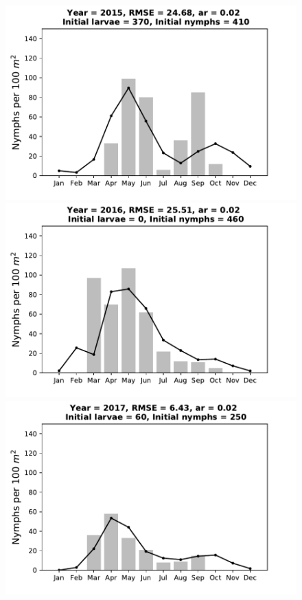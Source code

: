 \documentclass[a4paper, 11pt]{scrartcl}
\begin{document}
\begin{figure}[h!]
\begin{minipage}[c]{0.40\linewidth}
\end{minipage}
\begin{minipage}[c]{0.40\linewidth}
\includegraphics[width=\linewidth]{figures/s4/s4_2015}
\end{minipage}
\begin{minipage}[c]{0.40\linewidth}
\includegraphics[width=\linewidth]{figures/s4/s4_2016}
\end{minipage}
\begin{minipage}[c]{0.40\linewidth}
\includegraphics[width=\linewidth]{figures/s4/s4_2017}

\end{minipage}
\end{figure}
\end{document}
